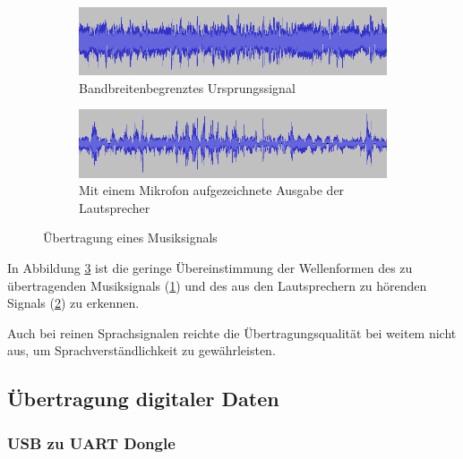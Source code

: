 \documentclass[12pt,a4paper]{article}
\begin{document}
\begin{figure}[H]
  \centering
  \begin{subfigure}[b]{1.0\textwidth}
    \includegraphics[width=\textwidth]{../audacity_sent.png}
    \caption{Bandbreitenbegrenztes Ursprungssignal}
    \label{fig:audacity_sent}
  \end{subfigure}  
  \begin{subfigure}[b]{1.0\textwidth}
    \includegraphics[width=\textwidth]{../audacity_received.png}
    \caption{Mit einem Mikrofon aufgezeichnete Ausgabe der Lautsprecher}
    \label{fig:audacity_received}
  \end{subfigure}  
  \caption{Übertragung eines Musiksignals}
  \label{fig:audacity}
\end{figure}

In Abbildung \ref{fig:audacity} ist die geringe Übereinstimmung der Wellenformen des zu übertragenden Musiksignals (\ref{fig:audacity_sent}) und des aus den Lautsprechern zu hörenden Signals (\ref{fig:audacity_received}) zu erkennen.

Auch bei reinen Sprachsignalen reichte die Übertragungsqualität bei weitem nicht aus, um Sprachverständlichkeit zu gewährleisten.

\subsection{Übertragung digitaler Daten}

\subsubsection{USB zu UART Dongle}
\end{document}
